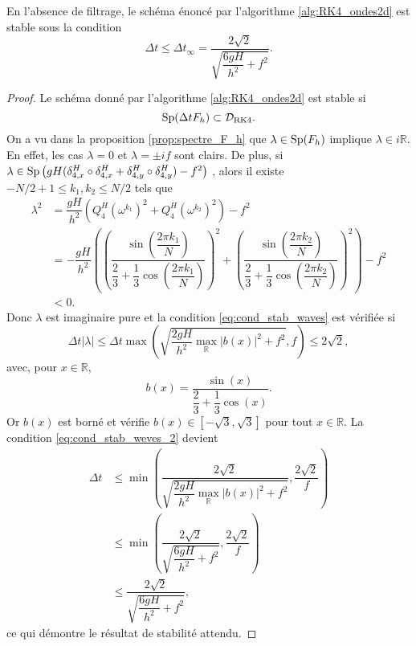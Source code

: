 \begin{theoreme}
En l'absence de filtrage, le schéma énoncé par l'algorithme \ref{alg:RK4_ondes2d} est stable sous la condition
\begin{equation}
\Delta t \leq \Delta t_{\infty} = \dfrac{2 \sqrt{2}}{\sqrt{\dfrac{6 g H}{h^2} + f^2}}.
\label{eq:stabilityc_conditions_ondes2D}
\end{equation}
\end{theoreme}

\begin{proof}
Le schéma donné par l'algorithme \ref{alg:RK4_ondes2d} est stable si
\begin{equation}
\Sp(\Delta t F_h) \subset \mathcal{D}_{\RK4}.
\label{eq:cond_stab_waves}
\end{equation}
On a vu dans la proposition \ref{prop:spectre_F_h} que $\lambda \in \text{Sp}(F_h)$ implique $\lambda \in i \mathbb{R}$. En effet, les cas $\lambda = 0$ et $\lambda = \pm i f$ sont clairs. De plus, si $\lambda \in \text{Sp} \left( gH (\delta_{4,x}^H \circ \delta_{4,x}^H + \delta_{4,y}^H \circ \delta_{4,y}^H) - f^2 \right)$ , alors il existe $-N/2+1 \leq k_1, k_2 \leq N/2$ tels que
\begin{align*}
\lambda^2 & = \dfrac{gH}{h^2} \left( Q_4^H (\omega^{k_1} )^2 + Q_4^H (\omega^{k_2} )^2 \right) - f^2 \\
		  & = -\dfrac{gH}{h^2} \left( \left( \dfrac{\sin \left( \dfrac{2 \pi k_1}{N}  \right)}{\dfrac{2}{3} + \dfrac{1}{3} \cos \left( \dfrac{2 \pi k_1}{N}  \right)} \right)^2 + \left( \dfrac{\sin \left( \dfrac{2 \pi k_2}{N}  \right)}{\dfrac{2}{3} + \dfrac{1}{3} \cos \left( \dfrac{2 \pi k_2}{N}  \right)} \right)^2 \right) - f^2\\
		  & < 0.
\end{align*}
Donc $\lambda$ est imaginaire pure et la condition \eqref{eq:cond_stab_waves} est vérifiée si
\begin{equation}
\Delta t |\lambda| \leq \Delta t \max \left( \sqrt{\dfrac{2gH}{h^2} \max_{\mathbb{R}} |b(x)|^2 +f^2  }, f \right) \leq 2 \sqrt{2},
\label{eq:cond_stab_weves_2}
\end{equation}
avec, pour $x \in \mathbb{R}$,
\begin{equation}
b(x) = \dfrac{\sin(x)}{\dfrac{2}{3} + \dfrac{1}{3} \cos(x)}.
\end{equation}
Or $b(x)$ est borné et vérifie $b(x) \in [-\sqrt{3}, \sqrt{3}]$ pour tout $x \in \mathbb{R}$. La condition \eqref{eq:cond_stab_weves_2} devient 
\begin{align*}
\Delta t & \leq \min \left( \dfrac{2 \sqrt{2}}{\sqrt{\dfrac{2gH}{h^2} \max_{\mathbb{R}} |b(x)|^2 + f^2}}, \dfrac{2\sqrt{2}}{f} \right) \\
		 & \leq  \min \left( \dfrac{2 \sqrt{2}}{\sqrt{\dfrac{6gH}{h^2} + f^2}}, \dfrac{2\sqrt{2}}{f} \right) \\
		 & \leq \dfrac{2 \sqrt{2}}{\sqrt{\dfrac{6gH}{h^2} + f^2}},
\end{align*}
ce qui démontre le résultat de stabilité attendu.
\end{proof}
